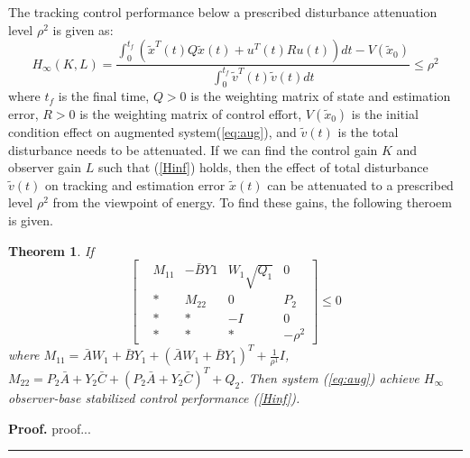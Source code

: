 \documentclass{ieeeaccess}
\newtheorem{theorem}{Theorem}
\newenvironment{proof}[1][Proof]{\noindent\textbf{#1.} }{\ \rule{0.5em}{0.5em}}
\begin{document}
The tracking control performance below a prescribed disturbance attenuation level $\rho^2$ is given as:
\begin{equation} \label{Hinf}
    H_{\infty}(K, L) = \frac{\int_{0}^{t_f}(\tilde{x}^T(t)Q\tilde{x}(t) + u^T(t)Ru(t))dt - V(\tilde{x}_0)}{\int_{0}^{t_f}\tilde{v}^T(t)\tilde{v}(t)dt}\leq \rho^2 
\end{equation}
where $t_f$ is the final time, $Q > 0$ is the weighting matrix of state and estimation error, $R > 0$ is the weighting matrix of control effort, $V(\tilde{x}_0)$ is the initial condition effect on augmented system(\ref{eq:aug}), and $\tilde{v}(t)$ is the total disturbance needs to be attenuated. If we can find the control gain $K$ and observer gain $L$ such that (\ref{Hinf}) holds, then the effect of total disturbance $\tilde{v}(t)$ on tracking and estimation error $\tilde{x}(t)$ can be attenuated to a prescribed level $\rho^2$ from the viewpoint of energy. To find these gains, the following theroem is given.
\begin{theorem} \label{theorem1}
    If
    $$\begin{bmatrix}
        & M_{11} & -\bar{B}Y1 & W_1\sqrt{Q_1} & 0 \\
        & \ast  & M_{22} & 0 & P_2 \\
        & \ast & \ast & -I & 0 \\
        & \ast & \ast & \ast & -\rho^2 
    \end{bmatrix}\leq 0 $$
    where $M_{11}=\bar{A}W_1+\bar{B}Y_1 + (\bar{A}W_1+\bar{B}Y_1)^T + \frac{1}{\rho^1}I$, $M_{22}=P_2\bar{A}+Y_2\bar{C} + (P_2\bar{A}+Y_2\bar{C})^T+Q_2$. Then system (\ref{eq:aug}) achieve $H_\infty$ observer-base stabilized control performance (\ref{Hinf}).
\end{theorem}
\begin{proof}
    proof...
\end{proof}

\end{document}

